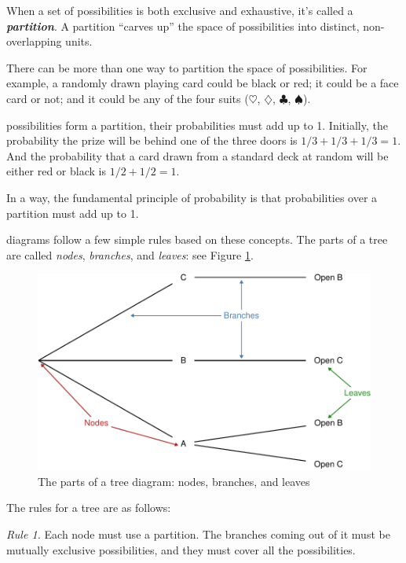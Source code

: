 \documentclass[justified]{tufte-book}
\theoremstyle{definition}
\theoremstyle{definition}
\theoremstyle{definition}
\theoremstyle{remark}
\begin{document}
When a set of possibilities is both exclusive and exhaustive, it's called a \textbf{\emph{partition}}. A partition ``carves up'' the space of possibilities into distinct, non-overlapping units.

There can be more than one way to partition the space of possibilities. For example, a randomly drawn playing card could be black or red; it could be a face card or not; and it could be any of the four suits (\(\heartsuit\), \(\diamondsuit\), \(\clubsuit\), \(\spadesuit\)).

 possibilities form a partition, their probabilities must add up to 1. Initially, the probability the prize will be behind one of the three doors is \(1/3 + 1/3 + 1/3 = 1\). And the probability that a card drawn from a standard deck at random will be either red or black is \(1/2 + 1/2 = 1\).

In a way, the fundamental principle of probability is that probabilities over a partition must add up to 1.

 diagrams follow a few simple rules based on these concepts. The parts of a tree are called \emph{nodes}, \emph{branches}, and \emph{leaves}: see Figure \ref{fig:treeparts}.

\begin{figure}
\includegraphics{_main_files/figure-latex/treeparts-1} \caption[The parts of a tree diagram]{The parts of a tree diagram: nodes, branches, and leaves}\label{fig:treeparts}
\end{figure}

The rules for a tree are as follows:

\emph{Rule 1.} Each node must use a partition. The branches coming out of it must be mutually exclusive possibilities, and they must cover all the possibilities.
\end{document}
